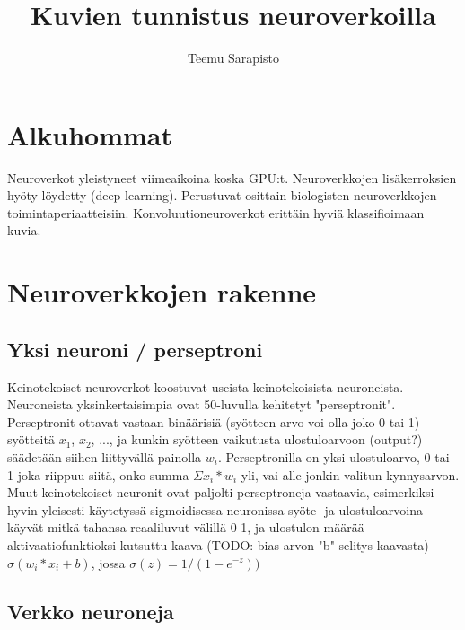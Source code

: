 \documentclass[11pt]{article}
\theoremstyle{plain}
\theoremstyle{definition}
\begin{document}
  \title{Kuvien tunnistus neuroverkoilla}
  \author{Teemu Sarapisto}
  \maketitle

  \section{Alkuhommat}


  Neuroverkot yleistyneet viimeaikoina koska GPU:t. Neuroverkkojen lisäkerroksien hyöty löydetty (deep learning). Perustuvat osittain biologisten neuroverkkojen toimintaperiaatteisiin. Konvoluutioneuroverkot erittäin hyviä klassifioimaan kuvia. \cite{Goodfellow-et-al-2016}


  \section{Neuroverkkojen rakenne}
  \subsection{Yksi neuroni / perseptroni}

   Keinotekoiset neuroverkot koostuvat useista keinotekoisista neuroneista. Neuroneista yksinkertaisimpia ovat 50-luvulla kehitetyt "perseptronit". Perseptronit ottavat vastaan binäärisiä (syötteen arvo voi olla joko 0 tai 1) syötteitä $x_1$, $x_2$, ..., ja kunkin syötteen vaikutusta ulostuloarvoon (output?) säädetään siihen liittyvällä painolla $w_i$. Perseptronilla on yksi ulostuloarvo, 0 tai 1 joka riippuu siitä, onko summa $\Sigma x_i * w_i$ yli, vai alle jonkin valitun kynnysarvon. Muut keinotekoiset neuronit ovat paljolti perseptroneja vastaavia, esimerkiksi hyvin yleisesti käytetyssä sigmoidisessa neuronissa syöte- ja ulostuloarvoina käyvät mitkä tahansa reaaliluvut välillä 0-1, ja ulostulon määrää aktivaatiofunktioksi kutsuttu kaava (TODO: bias arvon "b" selitys kaavasta) $\sigma(w_i*x_i + b)$, jossa $\sigma(z) = 1/(1-e^{-z}))$\cite{Nielsen-neural}

   \subsection{Verkko neuroneja}
\end{document}

